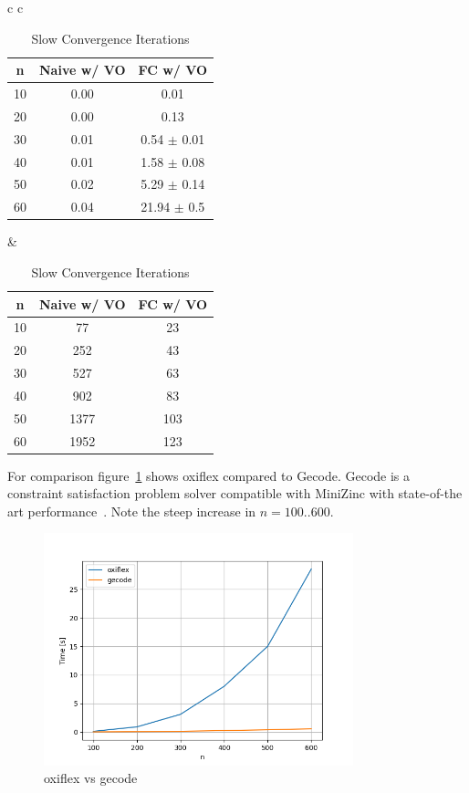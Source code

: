 \begin{table}[h!]
	\centering
	\begin{tabular}{c c}
		\begin{minipage}{.5\textwidth}
			\centering
			\begin{tabular}{| c | c | c |}
				\hline
				n  & Naive w/ VO & FC w/ VO        \\ \hline
				10 & 0.00        & 0.01            \\ \hline
				20 & 0.00        & 0.13            \\ \hline
				30 & 0.01        & 0.54 $\pm$ 0.01 \\ \hline
				40 & 0.01        & 1.58 $\pm$ 0.08 \\ \hline
				50 & 0.02        & 5.29 $\pm$ 0.14 \\ \hline
				60 & 0.04        & 21.94 $\pm$ 0.5 \\ \hline
			\end{tabular}
			\caption{Slow Convergence Time}
			\label{tab:slow:time}
		\end{minipage} &
		\begin{minipage}{.5\textwidth}
			\centering
			\begin{tabular}{| c | c | c |}
				\hline
				n  & Naive w/ VO & FC w/ VO \\ \hline
				10 & 77          & 23       \\ \hline
				20 & 252         & 43       \\ \hline
				30 & 527         & 63       \\ \hline
				40 & 902         & 83       \\ \hline
				50 & 1377        & 103      \\ \hline
				60 & 1952        & 123      \\ \hline
			\end{tabular}
			\caption{Slow Convergence Iterations}
			\label{tab:slow:iterations}
		\end{minipage}
	\end{tabular}
\end{table}

For comparison figure~\ref{fig:slow:gecode} shows oxiflex compared to Gecode. Gecode is a constraint satisfaction problem solver compatible with MiniZinc with state-of-the art performance~\cite{gecode}. Note the steep increase in $n = 100..600$.

\begin{figure}[ht]
	\centering
	\includegraphics[width=0.8\textwidth]{./Problems/slow_convergence/plots/gecode.png}
	\caption{oxiflex vs gecode}
	\label{fig:slow:gecode}
\end{figure}
